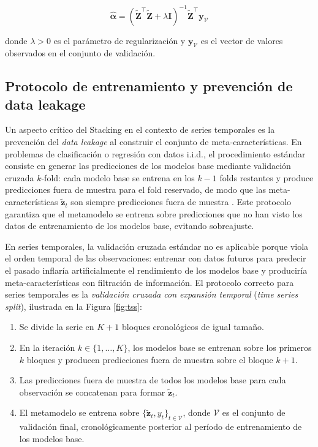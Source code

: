 \begin{equation}
    \hat{\boldsymbol{\alpha}} = \left(\tilde{\mathbf{Z}}^\top \tilde{\mathbf{Z}} + \lambda \mathbf{I}\right)^{-1} \tilde{\mathbf{Z}}^\top \mathbf{y}_\mathcal{V}
    \label{eq:stacking_ridge}
\end{equation}

donde $\lambda > 0$ es el parámetro de regularización y $\mathbf{y}_\mathcal{V}$ es el vector de valores observados en el conjunto de validación.

\subsection{Protocolo de entrenamiento y prevención de data leakage}

Un aspecto crítico del Stacking en el contexto de series temporales es la prevención del \textit{data leakage} al construir el conjunto de meta-características. En problemas de clasificación o regresión con datos i.i.d., el procedimiento estándar consiste en generar las predicciones de los modelos base mediante validación cruzada $k$-fold: cada modelo base se entrena en los $k-1$ folds restantes y produce predicciones fuera de muestra para el fold reservado, de modo que las meta-características $\tilde{\mathbf{z}}_t$ son siempre predicciones fuera de muestra \cite{StackingWolpert}. Este protocolo garantiza que el metamodelo se entrena sobre predicciones que no han visto los datos de entrenamiento de los modelos base, evitando sobreajuste.

En series temporales, la validación cruzada estándar no es aplicable porque viola el orden temporal de las observaciones: entrenar con datos futuros para predecir el pasado inflaría artificialmente el rendimiento de los modelos base y produciría meta-características con filtración de información. El protocolo correcto para series temporales es la \textit{validación cruzada con expansión temporal} (\textit{time series split}), ilustrada en la Figura \ref{fig:tss}:

\begin{enumerate}
    \item Se divide la serie en $K+1$ bloques cronológicos de igual tamaño.
    \item En la iteración $k \in \{1, \ldots, K\}$, los modelos base se entrenan sobre los primeros $k$ bloques y producen predicciones fuera de muestra sobre el bloque $k+1$.
    \item Las predicciones fuera de muestra de todos los modelos base para cada observación se concatenan para formar $\tilde{\mathbf{z}}_t$.
    \item El metamodelo se entrena sobre $\{\tilde{\mathbf{z}}_t, y_t\}_{t \in \mathcal{V}}$, donde $\mathcal{V}$ es el conjunto de validación final, cronológicamente posterior al período de entrenamiento de los modelos base.
\end{enumerate}

